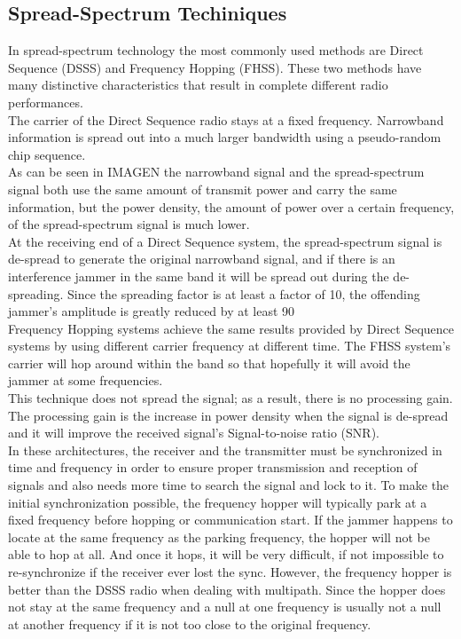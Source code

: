 \documentclass[12pt, a4paper,twoside]{tesi_upf}
\begin{document}
\subsection{Spread-Spectrum Techiniques}

In spread-spectrum technology the most commonly used methods are Direct Sequence (DSSS) and Frequency Hopping (FHSS). These two methods have many distinctive characteristics that result in complete different radio performances.
\\[12pt]

The carrier of the Direct Sequence radio stays at a fixed frequency. Narrowband information is spread out into a much larger bandwidth using a pseudo-random chip sequence.
\\[12pt]


As can be seen in IMAGEN the narrowband signal and the spread-spectrum signal both use the same amount of transmit power and carry the same information, but the power density, the amount of power over a certain frequency, of the spread-spectrum signal is much lower.
\\[12pt]

At the receiving end of a Direct Sequence system, the spread-spectrum signal is de-spread to generate the original narrowband signal, and if there is an interference jammer in the same band it will be spread out during the de-spreading. Since the spreading factor is at least a factor of 10, the offending jammer's amplitude is greatly reduced by at least 90%
\\[12pt]

Frequency Hopping systems achieve the same results provided by Direct Sequence systems by using different carrier frequency at different time. The FHSS system's carrier will hop around within the band so that hopefully it will avoid the jammer at some frequencies.
\\[12pt]


This technique does not spread the signal; as a result, there is no processing gain. The processing gain is the increase in power density when the signal is de-spread and it will improve the received signal's Signal-to-noise ratio (SNR).
\\[12pt]

In these architectures, the receiver and the transmitter must be synchronized in time and frequency in order to ensure proper transmission and reception of signals and also needs more time to search the signal and lock to it. To make the initial synchronization possible, the frequency hopper will typically park at a fixed frequency before hopping or communication start. If the jammer happens to locate at the same frequency as the parking frequency, the hopper will not be able to hop at all. And once it hops, it will be very difficult, if not impossible to re-synchronize if the receiver ever lost the sync.
However, the frequency hopper is better than the DSSS radio when dealing with multipath. Since the hopper does not stay at the same frequency and a null at one frequency is usually not a null at another frequency if it is not too close to the original frequency.
\\[12pt]
\end{document}
